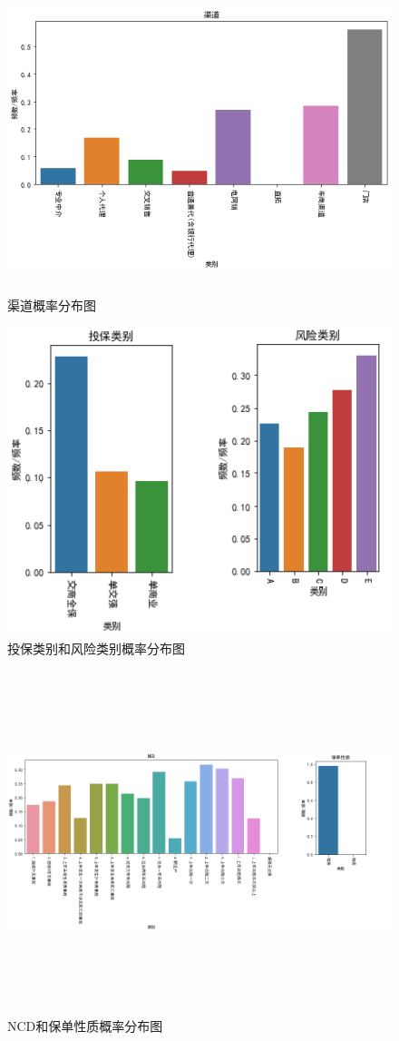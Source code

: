 \documentclass[UTF8,12pt,songti]{ctexart}
\begin{document}
\begin{figure}[H]
\centering
\includegraphics[width=12cm,height=9cm]{4-2-2-3.png}
\caption{渠道概率分布图}
\end{figure}
\begin{figure}[H]
\centering
\includegraphics[width=12cm,height=9cm]{4-2-2-4.png}
\caption{投保类别和风险类别概率分布图}
\end{figure}
\begin{figure}[H]
\centering
\includegraphics[width=18cm,height=10cm]{4-2-2-5.png}
\caption{NCD和保单性质概率分布图}
\end{figure}
\end{document}
